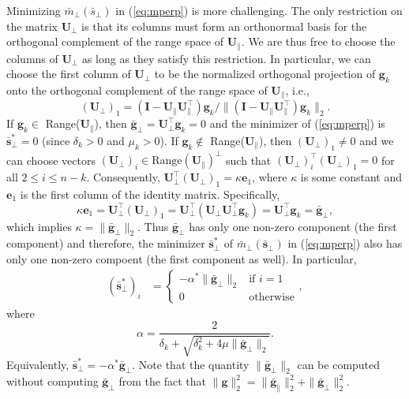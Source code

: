 Minimizing $\bar{m}_{\perp}(\bar{s}_{\perp})$ in (\ref{eq:mperp}) is more challenging.
The only restriction on the matrix $\mathbf{U}_{\perp}$ is that its columns must form an orthonormal basis for the orthogonal complement of the range space of $\mathbf{U}_{\parallel}$.  
We are thus free to choose the columns of $\mathbf{U}_{\perp}$ as long as they satisfy this restriction.
In particular, we can choose the first column of $\mathbf{U}_{\perp}$ to be the normalized orthogonal projection of $\mathbf{g}_k$ onto the orthogonal complement of the range space of $\mathbf{U}_{\parallel}$, i.e.,
$$
	(\mathbf{U}_{\perp})_1 = ( \mathbf{I} - \mathbf{U}_{\parallel}\mathbf{U}_{\parallel}^{\top})\mathbf{g}_k
	/ \| ( \mathbf{I} - \mathbf{U}_{\parallel}\mathbf{U}_{\parallel}^{\top})\mathbf{g}_k \|_2.
$$
If $\mathbf{g}_k \in $ Range($\mathbf{U}_{\parallel}$), then 
$\bar{\mathbf{g}}_{\perp} = \mathbf{U}_{\perp}^{\top}\mathbf{g}_k = 0$  
and the minimizer of (\ref{eq:mperp}) %
is $\bar{\mathbf{s}}_{\perp}^* = 0$ (since $\delta_k > 0$ and $\mu_k > 0$).
If $\mathbf{g}_k \notin $ Range($\mathbf{U}_{\parallel}$), then $(\mathbf{U}_{\perp})_1 \ne 0$ and 
we can choose vectors $ (\mathbf{U}_{\perp})_i \in \text{Range}(\mathbf{U}_{\parallel})^{\perp}$
such that $(\mathbf{U}_{\perp})_i^{\top} (\mathbf{U}_{\perp})_1 = 0$ for all $2 \le i \le n-k$.
Consequently,  $\mathbf{U}_{\perp}^{\top} (\mathbf{U}_{\perp})_1 = \kappa \mathbf{e}_1$,
where $\kappa$ is some constant and $\mathbf{e}_1$ is the first column of the identity matrix.  
Specifically,  
$$
	\kappa \mathbf{e}_1 
	=
	\mathbf{U}_{\perp}^{\top} (\mathbf{U}_{\perp})_1 
	= 
	\mathbf{U}_{\perp}^{\top}  \left ( \mathbf{U}_{\perp}  \mathbf{U}_{\perp}^{\top} \mathbf{g}_k \right )
	=
	\mathbf{U}_{\perp}^{\top} \mathbf{g}_k
	=
	\bar{\mathbf{g}}_{\perp},
$$
which implies $\kappa = \| \bar{\mathbf{g}}_{\perp} \|_2$.  Thus $ \bar{\mathbf{g}}_{\perp}$
has only one non-zero component (the first component) and therefore, the minimizer 
$\bar{\mathbf{s}}_{\perp}^*$ of 
$\bar{m}_{\perp} ( \bar{\mathbf{s}}_{\perp}) $ in (\ref{eq:mperp}) also has only one non-zero compoent (the first component as well).  In particular, 
\begin{align*}
	(\bar{\mathbf{s}}_{\perp}^*)_i
	&=
	\begin{cases}
		\displaystyle 
		-\alpha^* \| \bar{\mathbf{g}}_{\perp} \|_2
		& \text{if $i = 1$} 
		\\
		0 & \text{otherwise}
	\end{cases},
\end{align*}
where
\begin{equation}\label{eq:alphastar}
	\alpha=  \frac{2 }{ \delta_k 
		+ \sqrt{\delta_k^2 + 4 \mu \| \bar{\mathbf{g}}_{\perp} \|_2} }.
\end{equation}
Equivalently, $\bar{\mathbf{s}}_{\perp}^*=- \alpha^* \bar{\mathbf{g}}_{\perp}$.  
Note that the quantity $ \|  \bar{\mathbf{g}}_{\perp}\|_2$ can be computed without computing 
$ \bar{\mathbf{g}}_{\perp}$ from  the fact that $\| \mathbf{g} \|_2^2=
 \| \bar{\mathbf{g}}_{\parallel}\|_2^2 +  \| \bar{\mathbf{g}}_{\perp} \|_2^2$.  
 
